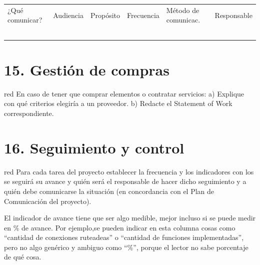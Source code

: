 \documentclass[11pt]{charter}
\begin{document}
\begin{table}[htpb]
\centering
\begin{tabularx}{\linewidth}{@{}|X|C{2.4cm}|C{3cm}|C{1.8cm}|C{2cm}|C{2.1cm}|@{}}
\hline
{} 
           \\ \hline
{} 
¿Qué comunicar? & Audiencia & Propósito & Frecuencia & Método de comunicac. & Responsable \\ \hline
                &           &           &            &                      &             \\ \hline
                &           &           &            &                      &             \\ \hline
                &           &           &            &                      &             \\ \hline
                &           &           &            &                      &             \\ \hline
                &           &           &            &                      &             \\ \hline
\end{tabularx}
\end{table}

\section{15. Gestión de compras}
\label{sec:compras}

\begin{consigna}{red}
En caso de tener que comprar elementos o contratar servicios:
a) Explique con qué criterios elegiría a un proveedor.
b) Redacte el Statement of Work correspondiente.
\end{consigna}

\section{16. Seguimiento y control}
\label{sec:seguimiento}

\begin{consigna}{red}
Para cada tarea del proyecto establecer la frecuencia y los indicadores con los se seguirá su avance y quién será el responsable de hacer dicho seguimiento y a quién debe comunicarse la situación (en concordancia con el Plan de Comunicación del proyecto).

El indicador de avance tiene que ser algo medible, mejor incluso si se puede medir en \% de avance. Por ejemplo,se pueden indicar en esta columna cosas como ``cantidad de conexiones ruteadeas'' o ``cantidad de funciones implementadas'', pero no algo genérico y ambiguo como ``\%'', porque el lector no sabe porcentaje de qué cosa.

\end{consigna}
\end{document}
